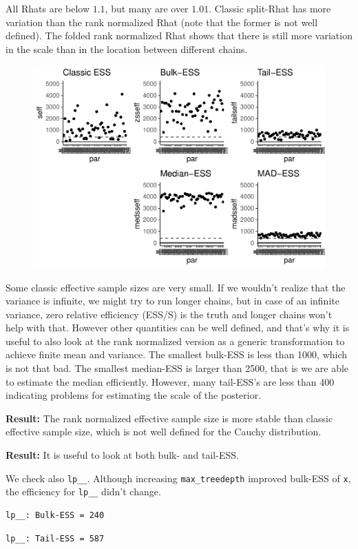 \documentclass[american,]{article}
\begin{document}
All Rhats are below \(1.1\), but many are over \(1.01\). Classic
split-Rhat has more variation than the rank normalized Rhat (note that
the former is not well defined). The folded rank normalized Rhat shows
that there is still more variation in the scale than in the location
between different chains.

\begin{figure}[tp]
  \centering
  \includegraphics[width=0.6\linewidth]{graphics/ess-fit-nom-td20-1.pdf}
\end{figure}

Some classic effective sample sizes are very small. If we wouldn't
realize that the variance is infinite, we might try to run longer
chains, but in case of an infinite variance, zero relative efficiency
(ESS/S) is the truth and longer chains won't help with that. However
other quantities can be well defined, and that's why it is useful to
also look at the rank normalized version as a generic transformation to
achieve finite mean and variance. The smallest bulk-ESS is less than
1000, which is not that bad. The smallest median-ESS is larger than
2500, that is we are able to estimate the median efficiently. However,
many tail-ESS's are less than 400 indicating problems for estimating the
scale of the posterior.

\textbf{Result:} The rank normalized effective sample size is more
stable than classic effective sample size, which is not well defined for
the Cauchy distribution.

\textbf{Result:} It is useful to look at both bulk- and tail-ESS.

We check also \texttt{lp\_\_}. Although increasing
\texttt{max\_treedepth} improved bulk-ESS of \texttt{x}, the efficiency
for \texttt{lp\_\_} didn't change.

\begin{verbatim}
lp__: Bulk-ESS = 240
\end{verbatim}

\begin{verbatim}
lp__: Tail-ESS = 587
\end{verbatim}
\end{document}
